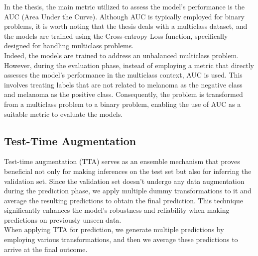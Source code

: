 In the thesis, the main metric utilized to assess the model's performance is
the AUC (Area Under the Curve). Although AUC is typically employed for binary
problems, it is worth noting that the thesis deals with a multiclass dataset,
and the models are trained using the Cross-entropy Loss function, specifically
designed for handling multiclass problems. \\

Indeed, the models are trained to address an unbalanced multiclass problem.
However, during the evaluation phase, instead of employing a metric that
directly assesses the model's performance in the multiclass context, AUC is
used. This involves treating labels that are not related to melanoma as the
negative class and melanoma as the positive class. Consequently, the problem is
transformed from a multiclass problem to a binary problem, enabling the use of
AUC as a suitable metric to evaluate the models.

\subsection{Test-Time Augmentation}

Test-time augmentation (TTA) serves as an ensemble mechanism that proves
beneficial not only for making inferences on the test set but also for
inferring the validation set. Since the validation set doesn't undergo any data
augmentation during the prediction phase, we apply multiple dummy
transformations to it and average the resulting predictions to obtain the final
prediction. This technique significantly enhances the model's robustness and
reliability when making predictions on previously unseen data. \\

When applying TTA for prediction, we generate multiple predictions
by employing various transformations, and then we average these predictions to
arrive at the final outcome.

